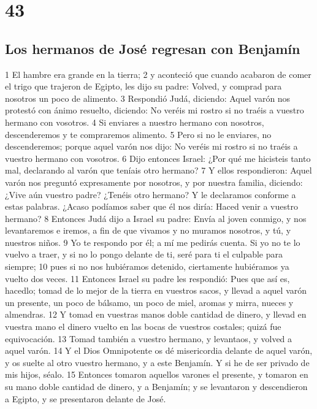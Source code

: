 \chapter{43}

\section{Los hermanos de José regresan con Benjamín}

1 El hambre era grande en la tierra;
2 y aconteció que cuando acabaron de comer el trigo que trajeron de Egipto, les dijo su padre: Volved, y comprad para nosotros un poco de alimento.
3 Respondió Judá, diciendo: Aquel varón nos protestó con ánimo resuelto, diciendo: No veréis mi rostro si no traéis a vuestro hermano con vosotros.
4 Si enviares a nuestro hermano con nosotros, descenderemos y te compraremos alimento.
5 Pero si no le enviares, no descenderemos; porque aquel varón nos dijo: No veréis mi rostro si no traéis a vuestro hermano con vosotros.
6 Dijo entonces Israel: ¿Por qué me hicisteis tanto mal, declarando al varón que teníais otro hermano?
7 Y ellos respondieron: Aquel varón nos preguntó expresamente por nosotros, y por nuestra familia, diciendo: ¿Vive aún vuestro padre? ¿Tenéis otro hermano? Y le declaramos conforme a estas palabras. ¿Acaso podíamos saber que él nos diría: Haced venir a vuestro hermano?
8 Entonces Judá dijo a Israel su padre: Envía al joven conmigo, y nos levantaremos e iremos, a fin de que vivamos y no muramos nosotros, y tú, y nuestros niños.
9 Yo te respondo por él; a mí me pedirás cuenta. Si yo no te lo vuelvo a traer, y si no lo pongo delante de ti, seré para ti el culpable para siempre;
10 pues si no nos hubiéramos detenido, ciertamente hubiéramos ya vuelto dos veces.
11 Entonces Israel su padre les respondió: Pues que así es, hacedlo; tomad de lo mejor de la tierra en vuestros sacos, y llevad a aquel varón un presente, un poco de bálsamo, un poco de miel, aromas y mirra, nueces y almendras.
12 Y tomad en vuestras manos doble cantidad de dinero, y llevad en vuestra mano el dinero vuelto en las bocas de vuestros costales; quizá fue equivocación.
13 Tomad también a vuestro hermano, y levantaos, y volved a aquel varón.
14 Y el Dios Omnipotente os dé misericordia delante de aquel varón, y os suelte al otro vuestro hermano, y a este Benjamín. Y si he de ser privado de mis hijos, séalo.
15 Entonces tomaron aquellos varones el presente, y tomaron en su mano doble cantidad de dinero, y a Benjamín; y se levantaron y descendieron a Egipto, y se presentaron delante de José.
